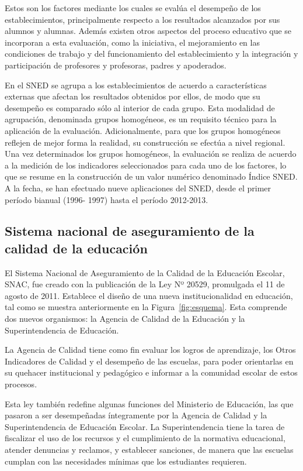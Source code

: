 \begin{description}
Estos son los factores mediante los cuales se evalúa el desempeño de los establecimientos, principalmente respecto a los resultados alcanzados por sus alumnos y alumnas. Además existen otros aspectos del proceso educativo que se incorporan a esta evaluación, como la iniciativa, el mejoramiento en las condiciones de trabajo y del funcionamiento del establecimiento y la integración y participación de profesores y profesoras, padres y apoderados.

En el SNED se agrupa a los establecimientos de acuerdo a características externas que afectan los resultados obtenidos por ellos, de modo que su desempeño es comparado sólo al interior de cada grupo. Esta modalidad de agrupación, denominada grupos homogéneos, es un requisito técnico para la aplicación de la evaluación. Adicionalmente, para que los grupos homogéneos reflejen de mejor forma la realidad, su construcción se efectúa a nivel regional. Una vez determinados los grupos homogéneos, la evaluación se realiza de acuerdo a la medición de los indicadores seleccionados para cada uno de los factores, lo que se resume en la construcción de un valor numérico denominado Índice SNED.
A la fecha, se han efectuado nueve aplicaciones del SNED, desde el primer período bianual (1996- 1997) hasta el período 2012-2013. \cite{sned}

\subsection{Sistema nacional de aseguramiento de la calidad de la educación}
El Sistema Nacional de Aseguramiento de la Calidad de la Educación Escolar, SNAC, fue creado con la publicación de la Ley Nº 20529, promulgada el 11 de agosto de 2011. Establece el diseño de una nueva institucionalidad en educación, tal como se muestra anteriormente en la Figura~\ref{fig:esquema}. Esta comprende dos nuevos organismos: la Agencia de Calidad de la Educación y la Superintendencia de Educación.

La Agencia de Calidad tiene como fin evaluar los logros de aprendizaje, los Otros Indicadores de Calidad y el desempeño de las escuelas, para poder orientarlas en su quehacer institucional y pedagógico e informar a la comunidad escolar de estos procesos.

Esta ley también redefine algunas funciones del Ministerio de Educación, las que pasaron a ser desempeñadas íntegramente por la Agencia de Calidad y la Superintendencia de Educación Escolar. La Superintendencia tiene la tarea de fiscalizar el uso de los recursos y el cumplimiento de la normativa educacional, atender denuncias y reclamos, y establecer sanciones, de manera que las escuelas cumplan con las necesidades mínimas que los estudiantes requieren.


\end{description}
